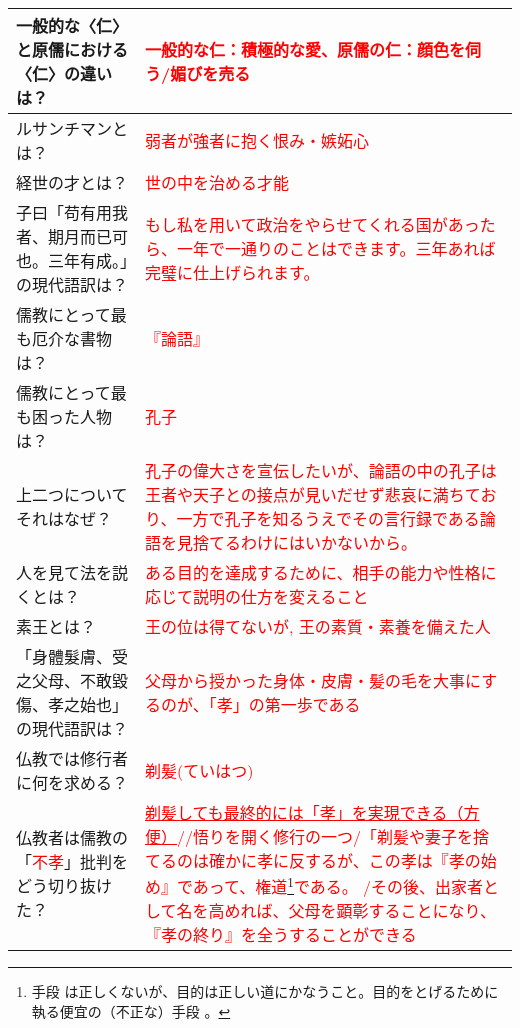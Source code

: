 \documentclass[a4paper,10pt]{article}
\begin{document}
\begin{longtable}{|p{}|p{}|}
一般的な〈仁〉と原儒における〈仁〉の違いは？ & \textcolor{red}{一般的な仁：積極的な愛、原儒の仁：顔色を伺う/媚びを売る} \\ \hline
ルサンチマンとは？ & \textcolor{red}{弱者が強者に抱く恨み・嫉妬心} \\ \hline
経世の才とは？ & \textcolor{red}{世の中を治める才能} \\ \hline
子曰「苟有用我者、期月而已可也。三年有成。」の現代語訳は？ & \textcolor{red}{もし私を用いて政治をやらせてくれる国があったら、一年で一通りのことはできます。三年あれば完璧に仕上げられます。} \\ \hline
儒教にとって最も厄介な書物は？ & \textcolor{red}{『論語』} \\ \hline
儒教にとって最も困った人物は？ & \textcolor{red}{孔子} \\ \hline
上二つについて それはなぜ？ & \textcolor{red}{孔子の偉大さを宣伝したいが、論語の中の孔子は王者や天子との接点が見いだせず悲哀に満ちており、一方で孔子を知るうえでその言行録である論語を見捨てるわけにはいかないから。}\\ \hline
人を見て法を説くとは？ & \textcolor{red}{ある目的を達成するために、相手の能力や性格に応じて説明の仕方を変えること} \\ \hline
素王とは？ & \textcolor{red}{王の位は得てないが, 王の素質・素養を備えた人} \\ \hline
「身體髮膚、受之父母、不敢毀傷、孝之始也」の現代語訳は？ & \textcolor{red}{父母から授かった身体・皮膚・髪の毛を大事にするのが、「孝」の第一歩である} \\ \hline
仏教では修行者に何を求める？ & \textcolor{red}{剃髪(ていはつ)} \\ \hline
仏教者は儒教の「\textcolor{red}{不孝}」批判をどう切り抜けた？ & \textcolor{red}{\underline{剃髪しても最終的には「孝」を実現できる（方便）}//悟りを開く修行の一つ/「剃髪や妻子を捨てるのは確かに孝に反するが、この孝は『孝の始め』であって、権道\footnote{手段 は正しくないが、目的は正しい道にかなうこと。目的をとげるために執る便宜の（不正な）手段 。}である。
/その後、出家者として名を高めれば、父母を顕彰することになり、『孝の終り』を全うすることができる} \\ \hline
\end{longtable}
\end{document}
